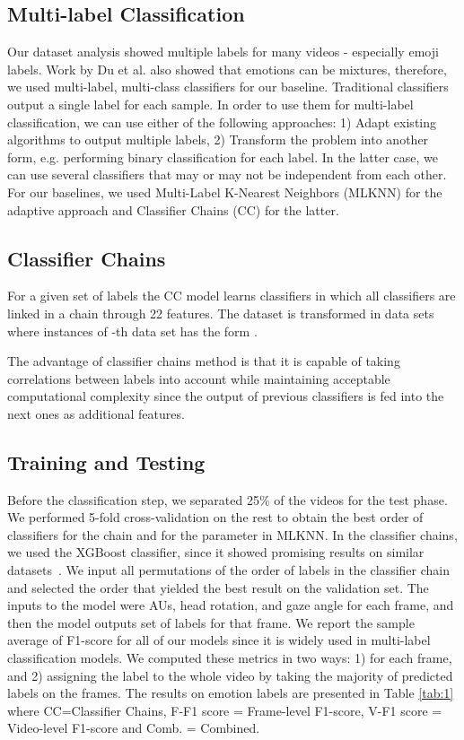 \documentclass[letterpaper, 10 pt, conference]{ieeeconf}  \usepackage{FG2021}
\begin{document}
\subsection{Multi-label Classification}
Our dataset analysis showed multiple labels for many videos - especially emoji labels. Work by Du et al. \cite{DuE1454} also showed that emotions can be mixtures, therefore, we used multi-label, multi-class classifiers for our baseline. Traditional classifiers output a single label for each sample. In order to use them for multi-label classification, we can use either of the following approaches: 1) Adapt existing algorithms to output multiple labels, 2) Transform the problem into another form, e.g. performing binary classification for each label. In the latter case, we can use several classifiers that may or may not be independent from each other. For our baselines, we used Multi-Label K-Nearest Neighbors (MLKNN) \cite{zhang-mlknn} for the adaptive approach and Classifier Chains (CC) \cite{classifier_chains} for the latter. 

\subsection{Classifier Chains}
For a given set of labels  the CC model learns  classifiers in which all classifiers are linked in a chain through 22 features. The dataset is transformed in  data sets where instances of -th data set has the form .

The advantage of classifier chains method is that it is capable of taking correlations between labels into account while maintaining acceptable computational complexity since the output of previous classifiers is fed into the next ones as additional features. 

\subsection{Training and Testing}
Before the classification step, we separated 25\% of the videos for the test phase. We performed 5-fold cross-validation on the rest to obtain the best order of classifiers for the chain and for the parameter  in MLKNN. In the classifier chains, we used the XGBoost \cite{xgboost} classifier, since it showed promising results on similar datasets~\cite{elderreact}. We input all permutations of the order of labels in the classifier chain and selected the order that yielded the best result on the validation set.
The inputs to the model were AUs, head rotation, and gaze angle for each frame, and then the model outputs set of labels for that frame. We report the sample average of F1-score for all of our models since it is widely used in multi-label classification models.
We computed these metrics in two ways: 1) for each frame, and 2) assigning the label to the whole video by taking the majority of predicted labels on the frames.
The results on emotion labels are presented in Table \ref{tab:1} where CC=Classifier Chains, F-F1 score = Frame-level F1-score, V-F1 score = Video-level F1-score and Comb. = Combined. 
\end{document}

